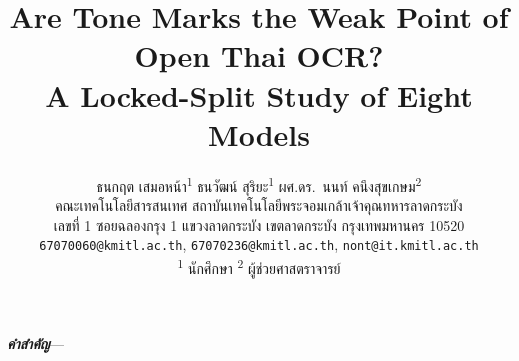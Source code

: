 \documentclass[12pt]{article}
\title{\Large\bfseries Are Tone Marks the Weak Point of Open Thai OCR?\\
A Locked-Split Study of Eight Models}
\author{%
  ธนกฤต เสมอหน้า\textsuperscript{1} \quad ธนวัฒน์ สุริยะ\textsuperscript{1} \quad ผศ.ดร.\ นนท์ คนึงสุขเกษม\textsuperscript{2}\\[4pt]
  \normalsize
  คณะเทคโนโลยีสารสนเทศ สถาบันเทคโนโลยีพระจอมเกล้าเจ้าคุณทหารลาดกระบัง\\
  เลขที่ 1 ซอยฉลองกรุง 1 แขวงลาดกระบัง เขตลาดกระบัง กรุงเทพมหานคร 10520\\[2pt]
  \small
  \texttt{67070060@kmitl.ac.th}, \texttt{67070236@kmitl.ac.th}, \texttt{nont@it.kmitl.ac.th}\\[2pt]
  \textsuperscript{1} นักศึกษา \quad \textsuperscript{2} ผู้ช่วยศาสตราจารย์
}
\date{}
\begin{document}
\maketitle

\begin{abstract}
\noindent

\end{abstract}

\noindent\textbf{\textit{คำสำคัญ}}---





\end{document}
